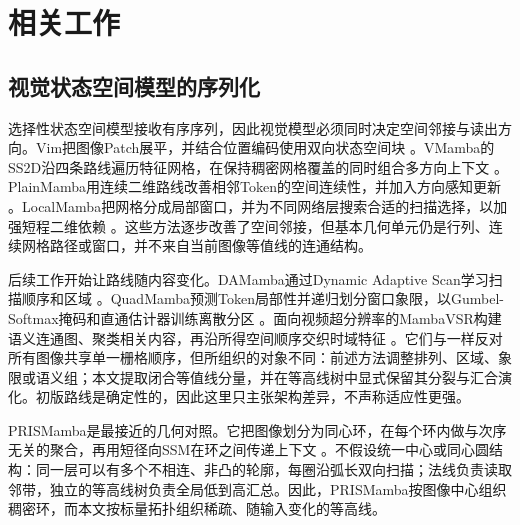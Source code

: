 \section{相关工作}

\subsection{视觉状态空间模型的序列化}

选择性状态空间模型接收有序序列，因此视觉模型必须同时决定空间邻接与读出方向。Vim把图像Patch展平，并结合位置编码使用双向状态空间块 \cite{zhu2024vim}。VMamba的SS2D沿四条路线遍历特征网格，在保持稠密网格覆盖的同时组合多方向上下文 \cite{liu2024vmamba}。PlainMamba用连续二维路线改善相邻Token的空间连续性，并加入方向感知更新 \cite{yang2024plainmamba}。LocalMamba把网格分成局部窗口，并为不同网络层搜索合适的扫描选择，以加强短程二维依赖 \cite{huang2024localmamba}。这些方法逐步改善了空间邻接，但基本几何单元仍是行列、连续网格路径或窗口，并不来自当前图像等值线的连通结构。

后续工作开始让路线随内容变化。DAMamba通过Dynamic Adaptive Scan学习扫描顺序和区域 \cite{li2025damamba}。QuadMamba预测Token局部性并递归划分窗口象限，以Gumbel-Softmax掩码和直通估计器训练离散分区 \cite{xie2024quadmamba}。面向视频超分辨率的MambaVSR构建语义连通图、聚类相关内容，再沿所得空间顺序交织时域特征 \cite{he2025mambavsr}。它们与\method{}一样反对所有图像共享单一栅格顺序，但所组织的对象不同：前述方法调整排列、区域、象限或语义组；本文提取闭合等值线分量，并在等高线树中显式保留其分裂与汇合演化。初版路线是确定性的，因此这里只主张架构差异，不声称适应性更强。

PRISMamba是最接近的几何对照。它把图像划分为同心环，在每个环内做与次序无关的聚合，再用短径向SSM在环之间传递上下文 \cite{hsieh2026prismamba}。\method{}不假设统一中心或同心圆结构：同一层可以有多个不相连、非凸的轮廓，每圈沿弧长双向扫描；法线负责读取邻带，独立的等高线树负责全局低到高汇总。因此，PRISMamba按图像中心组织稠密环，而本文按标量拓扑组织稀疏、随输入变化的等高线。

